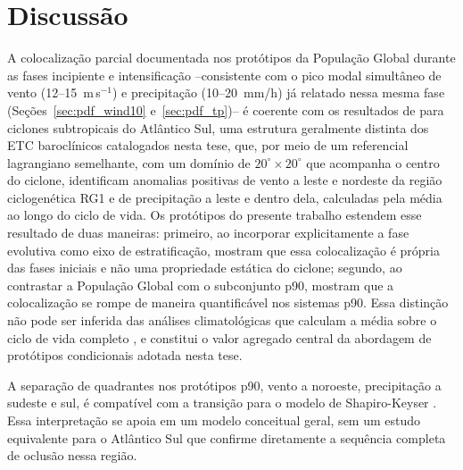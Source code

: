 \section{Discussão}\label{sec:discusion_prototipos}


A colocalização parcial documentada nos protótipos da População Global durante as fases incipiente e intensificação --consistente com o pico modal simultâneo de vento (12--15~m\,s$^{-1}$) e precipitação (10--20~mm/h) já relatado nessa mesma fase (Seções~\ref{sec:pdf_wind10} e~\ref{sec:pdf_tp})-- é coerente com os resultados de \citet{cardoso2022synoptic} para ciclones subtropicais do Atlântico Sul, uma estrutura geralmente distinta dos ETC baroclínicos catalogados nesta tese, que, por meio de um referencial lagrangiano semelhante, com um domínio de $20^{\circ} \times 20^{\circ}$ que acompanha o centro do ciclone, identificam anomalias positivas de vento a leste e nordeste da região ciclogenética RG1 e de precipitação a leste e dentro dela, calculadas pela média ao longo do ciclo de vida. Os protótipos do presente trabalho estendem esse resultado de duas maneiras: primeiro, ao incorporar explicitamente a fase evolutiva como eixo de estratificação, mostram que essa colocalização é própria das fases iniciais e não uma propriedade estática do ciclone; segundo, ao contrastar a População Global com o subconjunto p90, mostram que a colocalização se rompe de maneira quantificável nos sistemas p90. Essa distinção não pode ser inferida das análises climatológicas que calculam a média sobre o ciclo de vida completo \citep{gramcianinov2023impact}, e constitui o valor agregado central da abordagem de protótipos condicionais adotada nesta tese.


A separação de quadrantes nos protótipos p90, vento a noroeste, precipitação a sudeste e sul, é compatível com a transição para o modelo de Shapiro-Keyser \citep{shapiro1990life}. Essa interpretação se apoia em um modelo conceitual geral, sem um estudo equivalente para o Atlântico Sul que confirme diretamente a sequência completa de oclusão nessa região.


